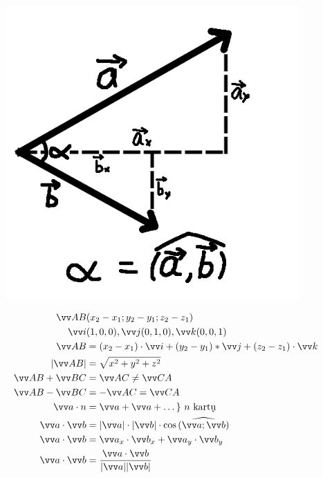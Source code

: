 \documentclass[fleqn]{article} %
\begin{document}
\begin{figure}
\includegraphics[scale=0.4]{vector_basics.png}
\end{figure}

\begin{equation}
    \hspace{10mm}
    \begin{aligned}
        \vec{AB} & (x_2 - x_1; y_2 - y_1; z_2 - z_1) \\
        \vec{i} & (1, 0, 0), \vec{j}(0, 1, 0), \vec{k}(0, 0, 1) \\
        \vec{AB} &= (x_2 - x_1) \cdot \vec{i} + (y_2 - y_1) * \vec{j} + (z_2 - z_1) \cdot \vec{k} \\
        |\vec{AB}| &= \sqrt{x^2 + y^2 + z^2} \\
        \vec{AB} + \vec{BC} &= \vec{AC} \ne \vec{CA} \\
        \vec{AB} - \vec{BC} &= -\vec{AC} = \vec{CA} \\
        \vec{a} \cdot n &= \vec{a} + \vec{a} + \dots \}\ n \text{ kartų} \\
        \vec{a} \cdot \vec{b} &= |\vec{a}| \cdot |\vec{b}| \cdot \cos{\widehat{(\vec{a}; \vec{b})}} \\
        \vec{a} \cdot \vec{b} &= \vec{a}_x \cdot \vec{b}_x + \vec{a}_y \cdot \vec{b}_y \\
        \vec{a} \cdot \vec{b} &= \frac{\vec{a} \cdot \vec{b}}{|\vec{a}||\vec{b}|}
    \end{aligned}
\end{equation}
\end{document}
